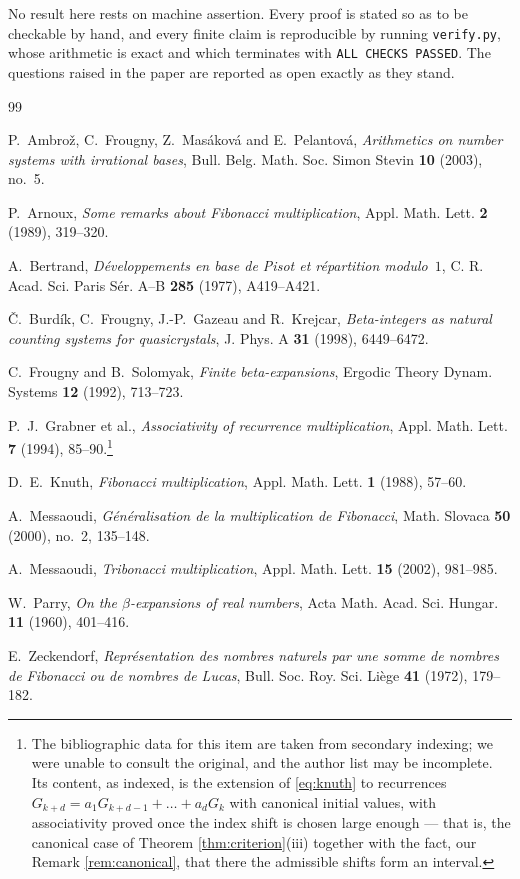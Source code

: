 \documentclass[11pt,reqno]{amsart}
\theoremstyle{plain}
\theoremstyle{definition}
\begin{document}
No result here rests on machine assertion. Every proof is stated so as to be checkable by hand, and
every finite claim is reproducible by running \texttt{verify.py}, whose arithmetic is exact and
which terminates with \texttt{ALL CHECKS PASSED}. The questions raised in the paper are reported as
open exactly as they stand.

\begin{thebibliography}{99}

 P.~Ambro\v{z}, C.~Frougny, Z.~Mas\'akov\'a and E.~Pelantov\'a,
  \emph{Arithmetics on number systems with irrational bases},
  Bull. Belg. Math. Soc. Simon Stevin \textbf{10} (2003), no.~5.

 P.~Arnoux, \emph{Some remarks about Fibonacci multiplication},
  Appl. Math. Lett. \textbf{2} (1989), 319--320.

 A.~Bertrand, \emph{D\'eveloppements en base de Pisot et r\'epartition modulo~$1$},
  C. R. Acad. Sci. Paris S\'er. A--B \textbf{285} (1977), A419--A421.

 \v{C}.~Burd\'ik, C.~Frougny, J.-P.~Gazeau and R.~Krejcar,
  \emph{Beta-integers as natural counting systems for quasicrystals},
  J. Phys. A \textbf{31} (1998), 6449--6472.

 C.~Frougny and B.~Solomyak, \emph{Finite beta-expansions},
  Ergodic Theory Dynam. Systems \textbf{12} (1992), 713--723.

 P.~J.~Grabner et al., \emph{Associativity of recurrence multiplication},
  Appl. Math. Lett. \textbf{7} (1994), 85--90.\footnote{The bibliographic data for this item are
  taken from secondary indexing; we were unable to consult the original, and the author list may be
  incomplete. Its content, as indexed, is the extension of \eqref{eq:knuth} to recurrences
  $G_{k+d}=a_{1}G_{k+d-1}+\dots+a_{d}G_{k}$ with canonical initial values, with associativity proved
  once the index shift is chosen large enough --- that is, the canonical case of
  Theorem \ref{thm:criterion}(iii) together with the fact, our Remark \ref{rem:canonical}, that
  there the admissible shifts form an interval.}

 D.~E.~Knuth, \emph{Fibonacci multiplication},
  Appl. Math. Lett. \textbf{1} (1988), 57--60.

 A.~Messaoudi, \emph{G\'en\'eralisation de la multiplication de Fibonacci},
  Math. Slovaca \textbf{50} (2000), no.~2, 135--148.

 A.~Messaoudi, \emph{Tribonacci multiplication},
  Appl. Math. Lett. \textbf{15} (2002), 981--985.

 W.~Parry, \emph{On the $\beta$-expansions of real numbers},
  Acta Math. Acad. Sci. Hungar. \textbf{11} (1960), 401--416.

 E.~Zeckendorf, \emph{Repr\'esentation des nombres naturels par une somme de
  nombres de Fibonacci ou de nombres de Lucas},
  Bull. Soc. Roy. Sci. Li\`ege \textbf{41} (1972), 179--182.

\end{thebibliography}
\end{document}
